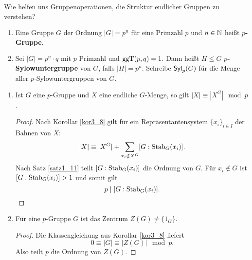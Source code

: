 \begin{leftbar}
	{Wie helfen uns Gruppenoperationen, die Struktur endlicher Gruppen zu verstehen?}
\end{leftbar}
\begin{definition}\label{definiton3_10}
	\begin{enumerate}[label=(\alph*)]
		\item Eine Gruppe $G$ der Ordnung $|G| = p^n$ für eine Primzahl $p$ und $n \in \mathbb{N}$ heißt \textbf{$p$-Gruppe}.
		\item Sei $|G| = p^n \cdot q$ mit $p$ Primzahl und $\mathrm{ggT}(p,q) = 1$. Dann heißt $H \leq G$ \textbf{$p$-Sylowuntergruppe} von $G$, falls $|H| = p^n$. Schreibe $\mathsf{Syl}_p(G)$ für die Menge aller $p$-Sylowuntergruppen von $G$.
	\end{enumerate}
\end{definition}
\begin{rem}\label{rem3_11}
\begin{enumerate}[label=(\roman*)]
	\item 	Ist $G$ eine $p$-Gruppe und $X$ eine endliche $G$-Menge, so gilt $|X| \equiv |X^G| \mod p$.
	\begin{proof}
		Nach Korollar \ref{kor3_8} gilt für ein Repräsentantensystem $\{x_i\}_{i \in I}$ der Bahnen von $X$:
		\[|X| \equiv |X^G| + \sum_{x_i \notin X^G} [G : \mathrm{Stab}_G(x_i)].\]
			Nach Satz \ref{satz1_11} teilt $[G: \mathrm{Stab}_G(x_i) ]$ die Ordnung von $G$. Für $x_i \notin G$ ist $[G : \mathrm{Stab}_G(x_i)] > 1$ und somit gilt
			\[p \mid [G : \mathrm{Stab}_G(x_i)].\]
	\end{proof}
	\item Für eine $p$-Gruppe $G$ ist das Zentrum $Z(G) \neq \{1_G\}$.
	\begin{proof}
		Die Klassengleichung aus Korollar \ref{kor3_8} liefert 
		\[0 \equiv |G| \equiv |Z(G)| \mod p.\]
		Also teilt $p$ die Ordnung von $Z(G)$.
	\end{proof}	
\end{enumerate}
\end{rem}
